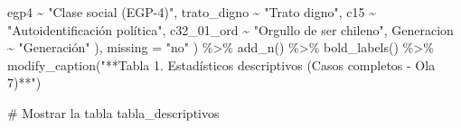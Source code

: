 \documentclass[
  spanish,
  a4paper,
  oneside]{scrbook}
\newenvironment{Shaded}{\begin{snugshade}}{\end{snugshade}}
\newcommand{\AttributeTok}[1]{\textcolor[rgb]{0.40,0.45,0.13}{#1}}
\newcommand{\CommentTok}[1]{\textcolor[rgb]{0.37,0.37,0.37}{#1}}
\newcommand{\FunctionTok}[1]{\textcolor[rgb]{0.28,0.35,0.67}{#1}}
\newcommand{\NormalTok}[1]{\textcolor[rgb]{0.00,0.23,0.31}{#1}}
\newcommand{\SpecialCharTok}[1]{\textcolor[rgb]{0.37,0.37,0.37}{#1}}
\newcommand{\StringTok}[1]{\textcolor[rgb]{0.13,0.47,0.30}{#1}}
\begin{document}
\begin{Shaded}
\begin{Highlighting}[]
\NormalTok{      egp4        }\SpecialCharTok{\textasciitilde{}} \StringTok{"Clase social (EGP{-}4)"}\NormalTok{,}
\NormalTok{      trato\_digno }\SpecialCharTok{\textasciitilde{}} \StringTok{"Trato digno"}\NormalTok{,}
\NormalTok{      c15         }\SpecialCharTok{\textasciitilde{}} \StringTok{"Autoidentificación política"}\NormalTok{,}
\NormalTok{      c32\_01\_ord  }\SpecialCharTok{\textasciitilde{}} \StringTok{"Orgullo de ser chileno"}\NormalTok{,}
\NormalTok{      Generacion  }\SpecialCharTok{\textasciitilde{}} \StringTok{"Generación"}
\NormalTok{    ),}
    \AttributeTok{missing =} \StringTok{"no"}
\NormalTok{  ) }\SpecialCharTok{\%\textgreater{}\%}
  \FunctionTok{add\_n}\NormalTok{() }\SpecialCharTok{\%\textgreater{}\%}
  \FunctionTok{bold\_labels}\NormalTok{() }\SpecialCharTok{\%\textgreater{}\%}
  \FunctionTok{modify\_caption}\NormalTok{(}\StringTok{"**Tabla 1. Estadísticos descriptivos (Casos completos {-} Ola 7)**"}\NormalTok{)}

\CommentTok{\# Mostrar la tabla}
\NormalTok{tabla\_descriptivos}
\end{Highlighting}
\end{Shaded}
\end{document}
